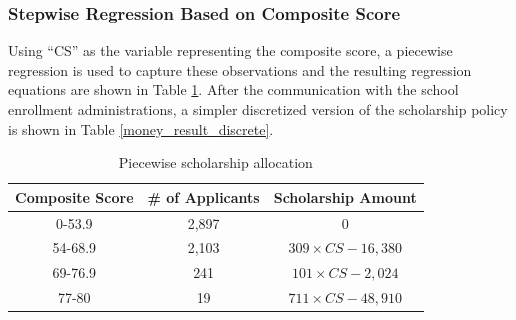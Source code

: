 \documentclass[12pt,english]{report}
\begin{document}

%


\subsubsection{Stepwise Regression Based on Composite Score}
Using ``CS'' as the variable representing the composite score, a piecewise 
regression is used to capture these observations and the resulting regression 
equations are shown in Table \ref{money_result}. After the communication with 
the school enrollment administrations,  a simpler discretized version of the 
scholarship policy is shown in Table \ref{money_result_discrete}. 




\begin{table}[H]
\centering
\begin{tabular}{|c|c|c|}
\hline
Composite Score & \# of Applicants & Scholarship Amount \\ \hline
0-53.9         & 2,897  &0              \\ \hline
54-68.9        & 2,103  &$309\times CS -16,380 $            \\ \hline
69-76.9        &  241 &  $101\times CS - 2,024$           \\ \hline
77-80       & 19 &   $711 \times CS -48,910$          \\ \hline
\end{tabular}
\caption{Piecewise scholarship allocation}
\label{money_result}
\end{table}
\end{document}
